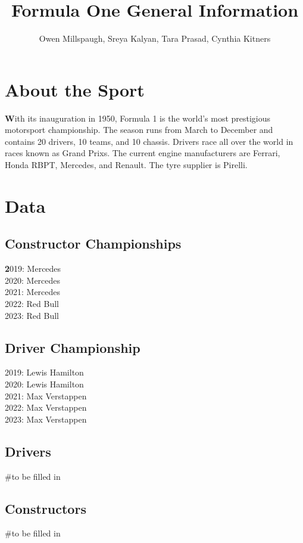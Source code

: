 \documentclass[12pt]{article}
\title{Formula One General Information}
\author{Owen Millspaugh, Sreya Kalyan, Tara Prasad, Cynthia Kitners}
\begin{document}
\maketitle

\section{About the Sport}
\textbf With its inauguration in 1950, Formula 1 is the world's most prestigious motorsport championship. 
The season runs from March to December and contains 20 drivers, 10 teams, and 10 chassis.
Drivers race all over the world in races known as Grand Prixs.
The current engine manufacturers are Ferrari, Honda RBPT, Mercedes, and Renault. 
The tyre supplier is Pirelli.
\section{Data}
\subsection{Constructor Championships}
\textbf 2019: Mercedes\\
2020: Mercedes\\
2021: Mercedes\\
2022: Red Bull\\
2023: Red Bull
\subsection{Driver Championship}
2019: Lewis Hamilton\\
2020: Lewis Hamilton\\
2021: Max Verstappen\\
2022: Max Verstappen\\
2023: Max Verstappen
\subsection{Drivers}

#to be filled in

\subsection{Constructors}

#to be filled in
\end{document}

